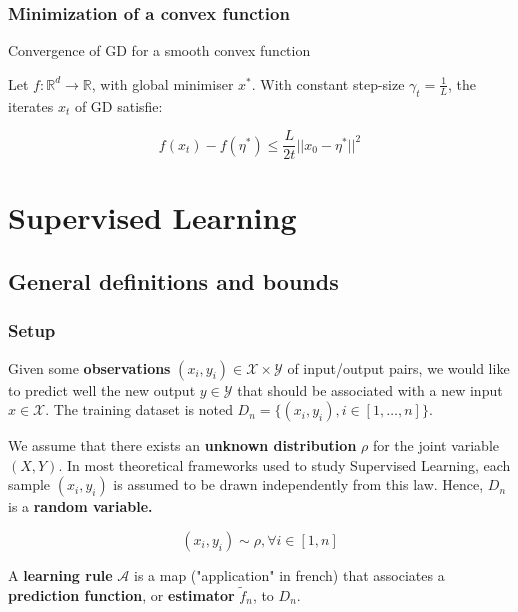 \documentclass[
10pt, %
a4paper, %
oneside, %
headinclude,footinclude, %
BCOR5mm, %
]{scrartcl}
\begin{document}
\subsubsection{\large\color{Periwinkle}Minimization of a convex function}

\begin{theorem}{Convergence of GD for a smooth convex function}

    Let $f: \mathbb{R}^d\rightarrow \mathbb{R} $, with global minimiser $x^*$. With constant step-size $\gamma_t = \frac{1}{L} $, the iterates $x_t$ of GD satisfie:

    \begin{equation*}
	f(x_t)-f(\eta^*)\leq \frac{L}{2t} ||x_0-\eta^*||^2
    \end{equation*}
\end{theorem}


\section{\large\color{Blue}Supervised Learning}

\subsection{\large\color{MidnightBlue}General definitions and bounds}

\subsubsection{\large\color{Periwinkle}Setup}

Given some \textbf{{observations}} $(x_i,y_i)\in \mathcal{X} \times \mathcal{Y}$ of input/output pairs, we would like to predict well the new output $y\in \mathcal{Y} $ that should be associated with a new input $x\in \mathcal{X} $. The training dataset is noted $D_n = \{(x_i, y_i), i\in [1, \dots, n]\}$.

We assume that there exists an \textbf{{unknown distribution}} $\rho$ for the joint variable $(X,Y)$.  In most theoretical frameworks used to study Supervised Learning, each sample $(x_i,y_i)$ is assumed to be drawn independently from this law. Hence, $D_n$ is a \textbf{{random variable.}} 

\begin{equation*}
    (x_i,y_i)\sim \rho, \forall i\in[1, n]
\end{equation*}

A \textbf{{learning rule}} $ \mathcal{A} $ is a map ("application" in french) that associates a \textbf{{prediction function}}, or \textbf{{estimator}}  $ \tilde{f}_n$, to $D_n$.
\end{document}
